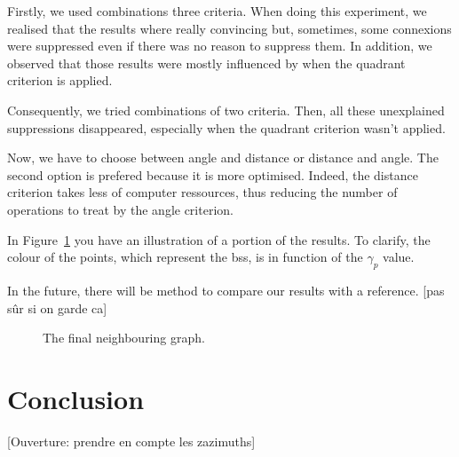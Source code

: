 \documentclass[lettersize,journal,english]{IEEEtran}
\begin{document}
        Firstly, we used combinations three criteria. When doing this experiment, we realised that the results where really convincing but, sometimes, some connexions were suppressed even if there was no reason to suppress them. In addition, we observed that those results were mostly influenced by when the quadrant criterion is applied.

        Consequently, we tried combinations of two criteria. Then, all these unexplained suppressions disappeared, especially when the quadrant criterion wasn't applied.

        Now, we have to choose between angle and distance or distance and angle. The second option is prefered because it is more optimised. Indeed, the distance criterion takes less of computer ressources, thus reducing the number of operations to treat by the angle criterion.

        In Figure~\ref{fig:final_neighs} you have an illustration of a portion of the results. To clarify, the colour of the points, which represent the \acrshort{bs}s, is in function of the $\gamma_p$ value.

        In the future, there will be method to compare our results with a reference. [pas sûr si on garde ca]
        \begin{figure}
            \centering
            \caption{The final neighbouring graph.}
            \label{fig:final_neighs}
        \end{figure}

\section{Conclusion\label{sec:ccl}}
    [Ouverture: prendre en compte les zazimuths]

\printglossary[type=\acronymtype]
\printglossary



\end{document}
